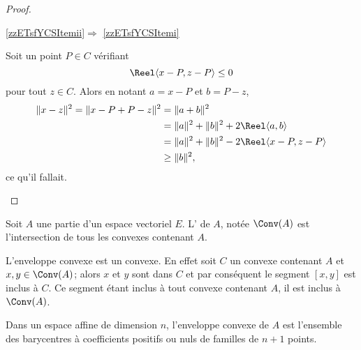 \begin{proof}
\begin{subproof}
        \item[\ref{zzETsfYCSItemii}\( \Rightarrow\) \ref{zzETsfYCSItemi}]

            Soit un point \( P\in C\) vérifiant 
            \begin{equation}
                \Reel\langle x-P, z-P\rangle \leq 0
            \end{equation}
            pour tout \( z\in C\). Alors en notant \( a=x-P\) et \( b=P-z\),
            \begin{equation}
                \begin{aligned}[]
                \| x-z \|^2=\| x-P+P-z \|^2&=\| a+b \|^2\\
                &=\| a \|^2+\| b \|^2+2\Reel\langle a, b\rangle \\
                &=\| a \|^2+\| b \|^2-2\Reel\langle x-P, z-P\rangle \\
                &\geq \| b \|^2,
                \end{aligned}
            \end{equation}
            ce qu'il fallait.

    \end{subproof}

\end{proof}

\begin{definition}
    Soit \( A\) une partie d'un espace vectoriel \( E\). L' de \( A\), notée \( \Conv(A)\) est l'intersection de tous les convexes contenant \( A\).
\end{definition}
L'enveloppe convexe est un convexe. En effet soit \( C\) un convexe contenant \( A\) et \( x,y\in\Conv(A)\); alors \( x\) et \( y \) sont dans \( C\) et par conséquent le segment \( [x,y]\) est inclus à \( C\). Ce segment étant inclus à tout convexe contenant \( A\), il est inclus à \( \Conv(A)\).

\begin{theorem} \label{ThoJLDjXLe}
    Dans un espace affine de dimension \( n\), l'enveloppe convexe de \( A\) est l'ensemble des barycentres à coefficients positifs ou nuls de familles de \( n+1\) points.
\end{theorem}

